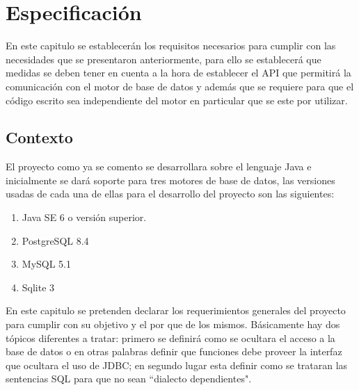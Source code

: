 \chapter{Especificación}
\label{capitulo:especificacion}
En este capitulo se establecerán los requisitos necesarios para cumplir con las necesidades que se presentaron anteriormente, para ello se establecerá que medidas se deben tener en cuenta a la hora de establecer el API que permitirá la comunicación con el motor de base de datos y además que se requiere para que el código escrito sea independiente del motor en particular que se este por utilizar.
%
%
\section{Contexto}
%
El proyecto como ya se comento se desarrollara sobre el lenguaje Java e inicialmente se dará soporte para tres motores de base de datos, las versiones usadas de cada una de ellas para el desarrollo del proyecto son las siguientes:
\begin{enumerate}
	\item Java SE 6 o versión superior.
	\item PostgreSQL 8.4
	\item MySQL 5.1
	\item Sqlite 3
\end{enumerate}
%
En este capitulo se pretenden declarar los requerimientos generales del proyecto para cumplir con su objetivo y el por que de los mismos. Básicamente hay dos tópicos diferentes a tratar: primero se definirá como se ocultara el acceso a la base de datos o en otras palabras definir que funciones debe proveer la interfaz que ocultara el uso de JDBC; en segundo lugar esta definir como se trataran las sentencias SQL para que no sean ``dialecto dependientes".
%
